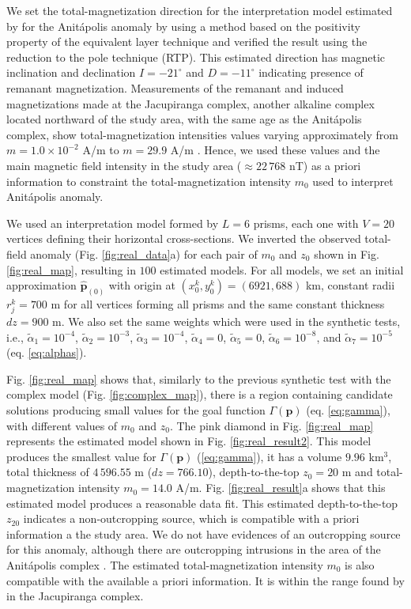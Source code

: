 We set the total-magnetization direction for the interpretation model estimated by \cite{reis-seg-2019} for the Anitápolis anomaly by using a method based on the positivity property of the equivalent layer technique \cite[]{dampney1969,emilia1973} and verified the 
result using the reduction to the pole technique (RTP). This estimated direction has magnetic inclination and declination $ I=-21^\circ $ and $ D=-11^\circ $ indicating presence of remanant magnetization.
Measurements of the remanant and induced magnetizations made at the Jacupiranga complex,
another alkaline complex located northward of the study area, 
with the same age as the Anit{\'a}polis complex, 
show total-magnetization intensities values varying approximately from $m = 1.0 \times 10^{-2}$ A/m to 
$m = 29.9$ A/m \citep[][ tb. 1]{valdivia-2009}.
Hence, we used these values and the main magnetic field intensity in the study area 
($\approx 22 \, 768 $ nT) as a priori information to constraint the 
total-magnetization intensity $m_{0}$ used to interpret Anit{\'a}polis anomaly.

We used an interpretation model formed by $L = 6$ prisms, each one with 
$V = 20$ vertices defining their horizontal cross-sections.
We inverted the observed total-field anomaly (Fig. \ref{fig:real_data}a) for each 
pair of $m_0$ and $z_0$ shown in Fig. \ref{fig:real_map}, resulting in $100$ estimated 
models. 
For all models, we set an initial approximation $\hat{\mathbf{p}}_{(0)}$ with origin 
at $(x_0^k, y_0^k) = (6921, 688)$ km, constant radii $r_j^k = 700$ m for 
all vertices forming all prisms and the same constant thickness $dz = 900$ m.
We also set the same weights which were used in the synthetic tests, i.e., $\tilde{\alpha}_1 = 10^{-4}$, 
$\tilde{\alpha}_2 = 10^{-3}$, 
$\tilde{\alpha}_3 = 10^{-4}$, $\tilde{\alpha}_4 = 0$, $\tilde{\alpha}_5 = 0$, 
$\tilde{\alpha}_6 = 10^{-8}$, and $\tilde{\alpha}_7 = 10^{-5}$ (eq. \ref{eq:alphas}). 

Fig. \ref{fig:real_map} shows that, similarly to the previous synthetic test with the 
complex model (Fig. \ref{fig:complex_map}), there is a region containing 
candidate solutions producing small values for the goal function 
$\Gamma(\mathbf{p})$ (eq. \ref{eq:gamma}), with different values of $m_0$ and $z_0$.
The pink diamond in Fig. \ref{fig:real_map} represents the estimated model 
shown in Fig. \ref{fig:real_result2}. 
This model produces the smallest value for $ \Gamma(\mathbf{p}) $ (\ref{eq:gamma}),
it has a volume $ 9.96 $ km$ ^3 $, total thickness of $ 4\,596.55 $ m 
($ dz = 766.10 $), depth-to-the-top $z_0 = 20$ m and total-magnetization intensity 
$m_0 = 14.0$ A/m.
Fig. \ref{fig:real_result}a shows that this estimated model produces a reasonable data fit.
This estimated depth-to-the-top $z_20$ indicates a non-outcropping source, 
which is compatible with a priori information a the study area. 
We do not have evidences of an outcropping source for this anomaly, 
although there are outcropping intrusions in the area of the Anit{\'a}polis 
complex \cite[]{gibson-1999}.
The estimated total-magnetization intensity $ m_0 $ is also compatible with the 
available a priori information. It is within the range found by 
\citet{valdivia-2009} in the Jacupiranga complex.

